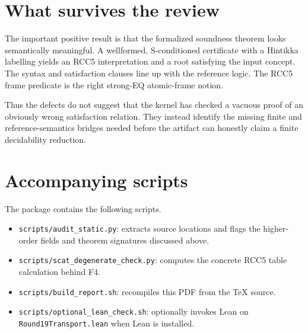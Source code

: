 \documentclass[11pt]{article}
\begin{document}
\section{What survives the review}

The important positive result is that the formalized soundness theorem looks
semantically meaningful.  A wellformed, S-conditioned certificate with a
Hintikka labelling yields an RCC5 interpretation and a root satisfying the
input concept.  The syntax and satisfaction clauses line up with the reference
logic.  The RCC5 frame predicate is the right strong-EQ atomic-frame notion.

Thus the defects do not suggest that the kernel has checked a vacuous proof of
an obviously wrong satisfaction relation.  They instead identify the missing
finite and reference-semantics bridges needed before the artifact can honestly
claim a finite decidability reduction.

\appendix
\section{Accompanying scripts}

The package contains the following scripts.
\begin{itemize}
  \item \texttt{scripts/audit\_static.py}: extracts source locations and flags
        the higher-order fields and theorem signatures discussed above.
  \item \texttt{scripts/scat\_degenerate\_check.py}: computes the concrete RCC5
        table calculation behind F4.
  \item \texttt{scripts/build\_report.sh}: recompiles this PDF from the TeX
        source.
  \item \texttt{scripts/optional\_lean\_check.sh}: optionally invokes Lean on
        \texttt{Round19Transport.lean} when Lean is installed.
\end{itemize}
\end{document}
